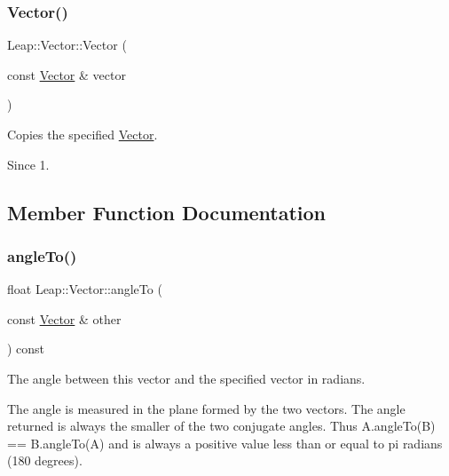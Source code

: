 \subsubsection{\texorpdfstring{Vector()}{Vector()}\hspace{0.1cm}{\footnotesize\ttfamily [3/3]}}
{\footnotesize\ttfamily Leap\+::\+Vector\+::\+Vector (\begin{DoxyParamCaption}\item[{const \hyperlink{struct_leap_1_1_vector}{Vector} \&}]{vector }\end{DoxyParamCaption})\hspace{0.3cm}{\ttfamily [inline]}}

Copies the specified \hyperlink{struct_leap_1_1_vector}{Vector}.


\begin{DoxyCodeInclude}
\end{DoxyCodeInclude}
 \begin{DoxySince}{Since}
1. 
\end{DoxySince}


\subsection{Member Function Documentation}
\mbox{\label{struct_leap_1_1_vector_ae76a80d9b19e35f3748afaf8fc7c9736}} 
\subsubsection{\texorpdfstring{angle\+To()}{angleTo()}}
{\footnotesize\ttfamily float Leap\+::\+Vector\+::angle\+To (\begin{DoxyParamCaption}\item[{const \hyperlink{struct_leap_1_1_vector}{Vector} \&}]{other }\end{DoxyParamCaption}) const\hspace{0.3cm}{\ttfamily [inline]}}

The angle between this vector and the specified vector in radians.

The angle is measured in the plane formed by the two vectors. The angle returned is always the smaller of the two conjugate angles. Thus {\ttfamily A.\+angle\+To(\+B) == B.\+angle\+To(\+A)} and is always a positive value less than or equal to pi radians (180 degrees).

